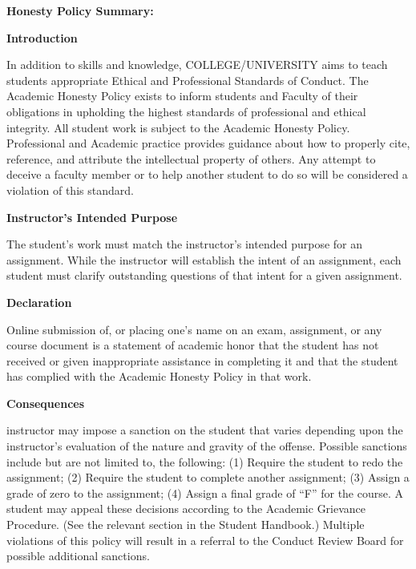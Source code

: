 \documentclass[11pt]{article}
\begin{document}
\textbf {\largeAcademic Honesty Policy Summary:} 

\textbf{Introduction}

\hspace{3mm}
\hangindent=5mm In addition to skills and knowledge, COLLEGE/UNIVERSITY aims to teach students appropriate Ethical and Professional Standards of Conduct. The Academic Honesty Policy exists to inform students and Faculty of their obligations in upholding the highest standards of professional and ethical integrity. All student work is subject to the Academic Honesty Policy. Professional and Academic practice provides guidance about how to properly cite, reference, and attribute the intellectual property of others. Any attempt to deceive a faculty member or to help another student to do so will be considered a violation of this standard.


\textbf{Instructor's Intended Purpose}

\hspace{3mm}
\hangindent=5mm The student's work must match the instructor's intended purpose for an assignment. While the instructor will establish the intent of an assignment, each student must clarify outstanding questions of that intent for a given assignment. 


\textbf{Declaration}

\hspace{3mm}
\hangindent=5mm Online submission of, or placing one's name on an exam, assignment, or any course document is a statement of academic honor that the student has not received or given inappropriate assistance in completing it and that the student has complied with the Academic Honesty Policy in that work.


\textbf{Consequences}

\hspace{3mm}
\hangindent=5mm  \An instructor may impose a sanction on the student that varies depending upon the instructor's evaluation of the nature and gravity of the offense.  Possible sanctions include but are not limited to, the following: (1) Require the student to redo the assignment; (2) Require the student to complete another assignment; (3) Assign a grade of zero to the assignment; (4) Assign a final grade of ``F'' for the course. A student may appeal these decisions according to the Academic Grievance Procedure. (See the relevant section in the Student Handbook.) Multiple violations of this policy will result in a referral to the Conduct Review Board for possible additional sanctions. \\
\end{document}

